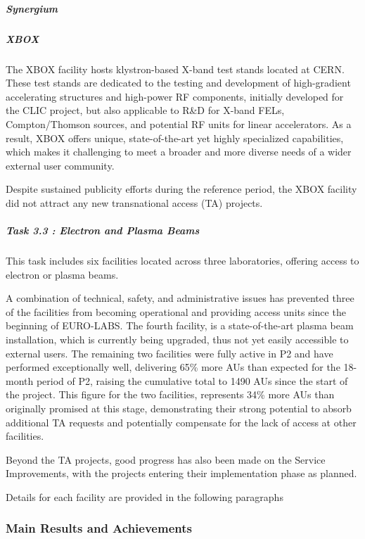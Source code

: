 \subparagraph{Synergium}\mbox{}


\subparagraph{XBOX}

The XBOX facility hosts klystron-based X-band test stands located at CERN. These test stands are dedicated to the testing and development of high-gradient accelerating structures and high-power RF components, initially developed for the CLIC project, but also applicable to R\&D for X-band FELs, Compton/Thomson sources, and potential RF units for linear accelerators. As a result, XBOX offers unique, state-of-the-art yet highly specialized capabilities, which makes it challenging to meet a broader and more diverse needs of a wider external user community.

Despite sustained publicity efforts during the reference period, the XBOX facility did not attract any new transnational access (TA) projects. 

\subparagraph{Task 3.3 : Electron and Plasma Beams} \mbox{}


This task includes six facilities located across three laboratories, offering access to electron or plasma beams.

A combination of technical, safety, and administrative issues has prevented three of the facilities from becoming operational and providing access units since the beginning of EURO-LABS. The fourth facility, is a state-of-the-art plasma beam installation, which is currently being upgraded, thus not yet easily accessible to external users. The remaining two facilities were fully active in P2 and have performed exceptionally well, delivering 65\% more AUs than expected for the 18-month period of P2, raising the cumulative total to 1490 AUs since the start of the project. This figure for the two facilities, represents 34\% more AUs than originally promised at this stage, demonstrating their strong potential to absorb additional TA requests and potentially compensate for the lack of access at other facilities.

Beyond the TA projects, good progress has also been made on the Service Improvements, with the projects entering their implementation phase as planned.

Details for each facility are provided in the following paragraphs

\subsubsection*{Main Results and Achievements}

